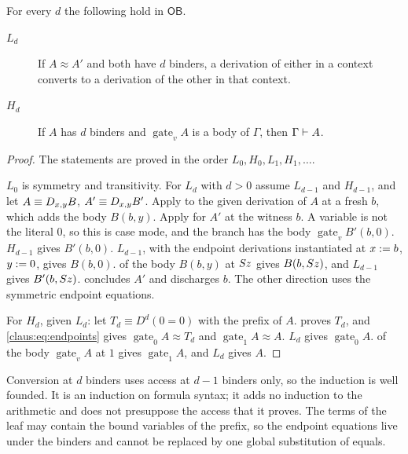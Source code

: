 \begin{lemma}
\label{claus:lem:access}
For every $d$ the following hold in $\mathsf{OB}$.
\begin{description}
\item[$L_d$] If $A\approx A'$ and both have $d$ binders, a derivation of
either in a context converts to a derivation of the other in that context.
\item[$H_d$] If $A$ has $d$ binders and $\operatorname{gate}_vA$ is a body
of $\Gamma$, then $\Gamma\vdash A$.
\end{description}
\end{lemma}
\begin{proof}
The statements are proved in the order $L_0,H_0,L_1,H_1,\dots$.

$L_0$ is symmetry and transitivity. For $L_d$ with $d>0$ assume $L_{d-1}$
and $H_{d-1}$, and let $A\equiv D_{x,y}B$, $A'\equiv D_{x,y}B'$. Apply
 to the given derivation of $A$ at a fresh $b$, which adds
the body $B(b,y)$. Apply  for $A'$ at the witness $b$. A
variable is not the literal $0$, so this is case mode, and the branch has
the body $\operatorname{gate}_v B'(b,0)$. $H_{d-1}$ gives $B'(b,0)$.
$L_{d-1}$, with the endpoint derivations instantiated at $x\mathrel{:=} b$,
$y\mathrel{:=} 0$, gives $B(b,0)$.  of the body $B(b,y)$ at
$S z$ gives $B(b,S z)$, and $L_{d-1}$ gives $B'(b,S z)$.
 concludes $A'$ and  discharges $b$. The
other direction uses the symmetric endpoint equations.

For $H_d$, given $L_d$: let $T_d\equiv D^d(0=0)$ with the prefix of $A$.
 proves $T_d$, and \eqref{claus:eq:endpoints}
gives $\operatorname{gate}_0A\approx T_d$ and
$\operatorname{gate}_1A\approx A$. $L_d$ gives
$\operatorname{gate}_0A$.  of the body
$\operatorname{gate}_vA$ at $1$ gives $\operatorname{gate}_1A$, and $L_d$
gives $A$.
\end{proof}

Conversion at $d$ binders uses access at $d-1$ binders only, so the
induction is well founded. It is an induction on formula syntax; it adds
no induction to the arithmetic and does not presuppose the access that it
proves. The terms of the leaf may contain the bound variables of the
prefix, so the endpoint equations live under the binders and cannot be
replaced by one global substitution of equals.

